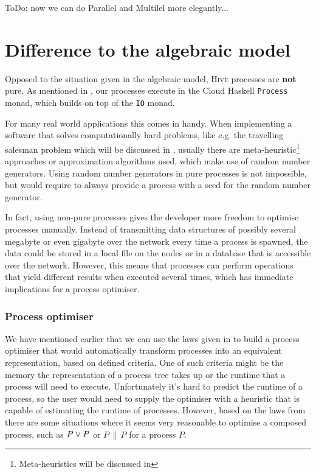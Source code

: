 ToDo: now we can do Parallel and Multilel more elegantly...


\section{Difference to the algebraic model}
\label{chp:difference_model_implementation}
Opposed to the situation given in the algebraic model, \textsc{Hive} processes are \textbf{not} pure. As mentioned in , our processes execute in the \textsf{Cloud Haskell} \texttt{Process} monad, which builds on top of the \texttt{IO} monad.

For many real world applications this comes in handy. When implementing a software that solves computationally hard problems, like e.g. the travelling salesman problem which will be discussed in , usually there are meta-heuristic\footnote{Meta-heuristics will be discussed in } approaches or approximation algorithms \cite{rolf2006approximationsalgorithmen} used, which make use of random number generators. Using random number generators in pure processes is not impossible, but would require to always provide a process with a seed for the random number generator.

In fact, using non-pure processes gives the developer more freedom to optimise processes manually. Instead of transmitting data structures of possibly several megabyte or even gigabyte over the network every time a process is spawned, the data could be stored in a local file on the nodes or in a database that is accessible over the network. However, this means that processes can perform operations that yield different results when executed several times, which has immediate implications for a process optimiser.

\subsubsection{Process optimiser}
We have mentioned earlier that we can use the laws given in  to build a process optimiser that would automatically transform processes into an equivalent representation, based on defined criteria. One of such criteria might be the memory the representation of a process tree takes up or the runtime that a process will need to execute. Unfortunately it's hard to predict the runtime of a process, so the user would need to supply the optimiser with a heuristic that is capable of estimating the runtime of processes. However, based on the laws from  there are some situations where it seems very reasonable to optimise a composed process, such as $P \vee P$ or $P \,\parallel\, P$ for a process $P$.

